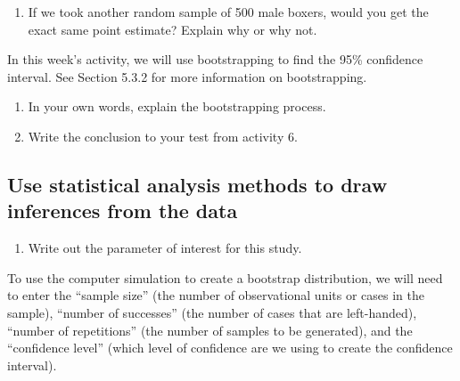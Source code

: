 \documentclass[
]{report}
\providecommand{\tightlist}{%
  \setlength{\itemsep}{0pt}\setlength{\parskip}{0pt}}
\begin{document}
\vspace{0.5in}

\begin{enumerate}
\def\labelenumi{\arabic{enumi}.}
\setcounter{enumi}{1}
\tightlist
\item
  If we took another random sample of 500 male boxers, would you get the exact same point estimate? Explain why or why not.
\end{enumerate}

\vspace{0.5in}

In this week's activity, we will use bootstrapping to find the 95\% confidence interval. See Section 5.3.2 for more information on bootstrapping.

\begin{enumerate}
\def\labelenumi{\arabic{enumi}.}
\setcounter{enumi}{2}
\item
  In your own words, explain the bootstrapping process.
  \vspace{0.5in}
\item
  Write the conclusion to your test from activity 6.
\end{enumerate}

\vspace{0.5in}

\hypertarget{use-statistical-analysis-methods-to-draw-inferences-from-the-data}{%
\subsection*{Use statistical analysis methods to draw inferences from the data}\label{use-statistical-analysis-methods-to-draw-inferences-from-the-data}}

\begin{enumerate}
\def\labelenumi{\arabic{enumi}.}
\setcounter{enumi}{4}
\tightlist
\item
  Write out the parameter of interest for this study.
\end{enumerate}

\vspace{0.5in}

To use the computer simulation to create a bootstrap distribution, we will need to enter the ``sample size'' (the number of observational units or cases in the sample), ``number of successes'' (the number of cases that are left-handed), ``number of repetitions'' (the number of samples to be generated), and the ``confidence level'' (which level of confidence are we using to create the confidence interval).
\end{document}
